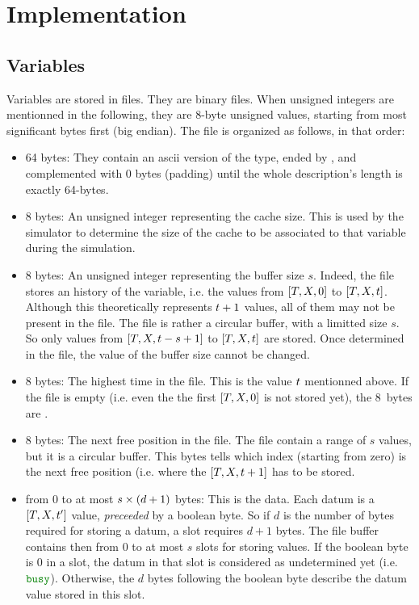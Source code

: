 \section{Implementation}

\subsection{Variables}

Variables are stored in  files. They are binary files. When unsigned integers are mentionned in the following, they are 8-byte unsigned values, starting from most significant bytes first (big endian). The file is organized as follows, in that order:
\begin{itemize}
\item 64 bytes: They contain an ascii version of the type, ended by , and complemented with 0 bytes (padding) until the whole description's length is exactly 64-bytes.
\item 8 bytes: An unsigned integer representing the cache size. This is used by the simulator to determine the size of the cache to be associated to that variable during the simulation.
\item 8 bytes: An unsigned integer representing the buffer size $s$. Indeed, the file stores an history of the variable, i.e. the values from ${\left[T,X,0\right]}$ to ${{\left[T,X,t\right]}}$. Although this theoretically represents $t+1$ values, all of them may not be present in the file. The file is rather a circular buffer, with a limitted size $s$. So only values from ${\left[T,X,t - s + 1\right]}$ to ${{\left[T,X,t\right]}}$ are stored. Once determined in the file, the value of the buffer size cannot be changed.
\item 8 bytes: The highest time in the file. This is the value $t$ mentionned above. If the file is empty (i.e. even the the first ${\left[T,X,0\right]}$ is not stored yet), the 8~bytes are .
\item 8 bytes: The next free position in the file. The file contain a range of $s$ values, but it is a circular buffer. This bytes tells which index (starting from zero) is the next free position (i.e. where the ${\left[T,X,t+1\right]}$ has to be stored.
\item from 0 to at most $s\times{\left({d+1}\right)}$ bytes: This is the data. Each datum is a ${\left[T,X,t'\right]}$ value, {\em preceeded} by a boolean byte. So if $d$ is the number of bytes required for storing a datum, a slot requires $d+1$ bytes. The file buffer contains then from 0 to at most $s$ slots for storing values. If the boolean byte is 0 in a slot, the datum in that slot is considered as undetermined yet (i.e. $\Busy$). Otherwise, the $d$ bytes following the boolean byte describe the datum value stored in this slot.
\end{itemize}
